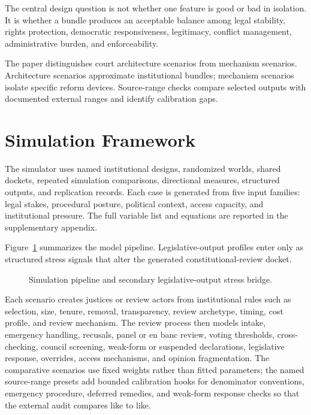 \documentclass[
  journal=small,
  manuscript=research-article,
  year=2026
]{cup-journal}
\begin{document}
The central design question is not whether one feature is good or bad in isolation. It is whether a bundle produces an acceptable balance among legal stability, rights protection, democratic responsiveness, legitimacy, conflict management, administrative burden, and enforceability.

The paper distinguishes court architecture scenarios from mechanism scenarios. Architecture scenarios approximate institutional bundles; mechanism scenarios isolate specific reform devices. Source-range checks compare selected outputs with documented external ranges and identify calibration gaps.

\section{Simulation Framework}
\label{sec:framework}

The simulator uses named institutional designs, randomized worlds, shared dockets, repeated simulation comparisons, directional measures, structured outputs, and replication records. Each case is generated from five input families: legal stakes, procedural posture, political context, access capacity, and institutional pressure. The full variable list and equations are reported in the supplementary appendix.

Figure~\ref{fig:model-pipeline} summarizes the model pipeline. Legislative-output profiles enter only as structured stress signals that alter the generated constitutional-review docket.

\begin{figure}[hbt!]
\centering

\caption{Simulation pipeline and secondary legislative-output stress bridge.}
\label{fig:model-pipeline}
\end{figure}

Each scenario creates justices or review actors from institutional rules such as selection, size, tenure, removal, transparency, review archetype, timing, cost profile, and review mechanism. The review process then models intake, emergency handling, recusals, panel or en banc review, voting thresholds, cross-checking, council screening, weak-form or suspended declarations, legislative response, overrides, access mechanisms, and opinion fragmentation. The comparative scenarios use fixed weights rather than fitted parameters; the named source-range presets add bounded calibration hooks for denominator conventions, emergency procedure, deferred remedies, and weak-form response checks so that the external audit compares like to like.
\end{document}
